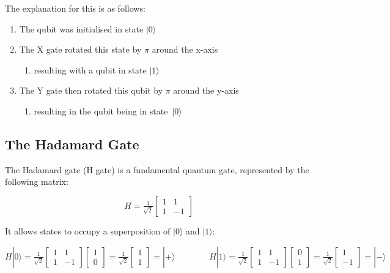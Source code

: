 The explanation for this is as follows:
\begin{enumerate}
    \item The qubit was initialised in state $|0\rangle$
    \item The X gate rotated this state by $\pi$ around the x-axis
    \begin{enumerate}
        \item resulting with a qubit in state $|1\rangle$
    \end{enumerate}
    \item The Y gate then rotated this qubit by $\pi$ around the y-axis
    \begin{enumerate}
        \item resulting in the qubit being in state~$|0\rangle$
    \end{enumerate} 
\end{enumerate}

\subsection{The Hadamard Gate}
The Hadamard gate (H gate) is a fundamental quantum gate, represented by the following matrix:

$$ H = \tfrac{1}{\sqrt{2}}\begin{bmatrix} 1 & 1 \\ 1 & -1 \end{bmatrix} $$

It allows states to occupy a superposition of $|0\rangle$ and $|1\rangle$:

$$ H|0\rangle = \tfrac{1}{\sqrt{2}}\begin{bmatrix} 1 & 1 \\ 1 & -1 \end{bmatrix}\begin{bmatrix} 1 \\ 0 \end{bmatrix} = \tfrac{1}{\sqrt{2}} \begin{bmatrix} 1 \\ 1 \end{bmatrix}= |+\rangle 
\quad \quad \quad \quad 
H|1\rangle = \tfrac{1}{\sqrt{2}}\begin{bmatrix} 1 & 1 \\ 1 & -1 \end{bmatrix}\begin{bmatrix} 0 \\ 1 \end{bmatrix} = \tfrac{1}{\sqrt{2}} \begin{bmatrix} 1 \\ -1 \end{bmatrix}= |-\rangle $$

